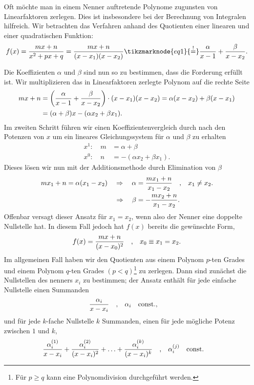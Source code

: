 Oft möchte man in einem Nenner auftretende Polynome zugunsten von Linearfaktoren zerlegen. Dies ist insbesondere bei der Berechnung von Integralen hilfreich. Wir betrachten das Verfahren anhand des Quotienten einer linearen und einer quadratischen Funktion: 
\begin{align}
    f(x) = \frac{mx + n}{x^2 +px + q} = \frac{mx +n}{(x-x_1)(x-x_2)} \tikzmarknode{eq1}{\overset{!}{=}} \frac{\alpha}{x-1} + \frac{\beta}{x-x_2}.
\end{align}

Die Koeffizienten $\alpha$ und $\beta$ sind nun so zu bestimmen, dass die Forderung erfüllt ist. Wir multiplizieren das in Linearfaktoren zerlegte Polynom auf die rechte Seite 
\begin{align}
    mx + n &= \qty(\frac{\alpha}{x-1} + \frac{\beta}{x-x_2}) \cdot (x-x_1)(x-x_2) = \alpha (x-x_2) + \beta(x-x_1) \notag \\
    &= (\alpha + \beta) x - (\alpha x_2 + \beta x_1).
\end{align}
Im zweiten Schritt führen wir einen Koeffizientenvergleich durch nach den Potenzen von $x$ um ein lineares Gleichungssystem für $\alpha$ und $\beta$ zu erhalten
\begin{subequations}
    \begin{align}
        x^1: \quad m &= \alpha + \beta \\
        x^0: \quad n &= -(\alpha x_2 + \beta x_1).
    \end{align}
\end{subequations}
Dieses lösen wir nun mit der Additionsmethode durch Elimination von $\beta$ 
\begin{align}
    m x_1 + n = \alpha (x_1 - x_2) \quad \Rightarrow \quad \alpha &= \frac{m x_1 + n}{x_1 -x_2} \qq{,} x_1 \neq x_2. \\
    \Rightarrow \quad \beta &= -\frac{m x_2 + n}{x_1 -x_2}.
\end{align}
Offenbar versagt dieser Ansatz für $x_1 = x_2$, wenn also der Nenner eine doppelte Nullstelle hat. In diesem Fall jedoch hat $f(x)$ bereits die gewünschte Form, 
\begin{align}
    f(x) = \frac{mx + n}{(x-x_0)^2} \qq{,} x_0 \equiv x_1 = x_2.
\end{align}
Im allgemeinen Fall haben wir den Quotienten aus einem Polynom $p$-ten Grades und einem Polynom $q$-ten Grades $(p < q)$\footnote{Für $p\ge q$ kann eine Polynomdivision durchgeführt werden.} zu zerlegen. Dann sind zunächst die Nullstellen des nenners $x_i$ zu bestimmen; der Ansatz enthält für jede einfache Nullstelle einen Summanden 
\begin{align}
    \frac{\alpha_i}{x-x_i} \qq{,} \alpha_i \qq{const.,}
\end{align}
und für jede $k$-fache Nullstelle $k$ Summanden, einen für jede mögliche Potenz zwischen $1$ und $k$, 
\begin{align}
    \frac{\alpha_i^{(1)}}{x-x_i} + \frac{\alpha_i^{(2)}}{(x-x_i)^2} + \hdots + \frac{\alpha_i^{(k)}}{(x-x_i)^k} \qq{,} \alpha_i^{(j)} \qq{const.}
\end{align} 


